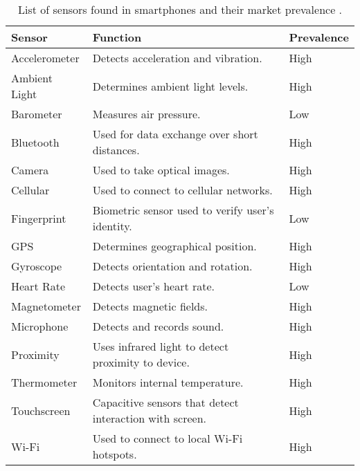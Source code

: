 \begin{table}[]
    \begin{tabular}{lll}
    \hline
    \textbf{Sensor} & \textbf{Function}                                       & \textbf{Prevalence} \\ \hline
    Accelerometer   & Detects acceleration and vibration.                     & High                \\
    Ambient Light   & Determines ambient light levels.                        & High                \\
    Barometer       & Measures air pressure.                                  & Low                 \\
    Bluetooth       & Used for data exchange over short distances.            & High                \\
    Camera          & Used to take optical images.                            & High                \\
    Cellular        & Used to connect to cellular networks.                   & High                \\
    Fingerprint     & Biometric sensor used to verify user's identity.        & Low                 \\
    GPS             & Determines geographical position.                       & High                \\
    Gyroscope       & Detects orientation and rotation.                       & High                \\
    Heart Rate      & Detects user's heart rate.                              & Low                 \\
    Magnetometer    & Detects magnetic fields.                                & High                \\
    Microphone      & Detects and records sound.                              & High                \\
    Proximity       & Uses infrared light to detect proximity to device.      & High                \\
    Thermometer     & Monitors internal temperature.                          & High                \\
    Touchscreen     & Capacitive sensors that detect interaction with screen. & High                \\
    Wi-Fi           & Used to connect to local Wi-Fi hotspots.                & High                \\ \hline
    \end{tabular}
    \caption{List of sensors found in smartphones and their market prevalence \cite{Priyadarshini2018}.}
    \label{tab:lit_sensors}
\end{table}

